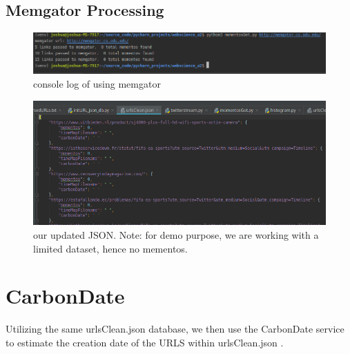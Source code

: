 \documentclass[11pt]{article}
\begin{document}
	\subsection{Memgator Processing}
	\begin{figure}[h!]
		\includegraphics[scale=0.5]{resources/memgator_console.png}
		\caption{console log of using memgator}
	\end{figure}
	\begin{figure}[h!]
		\includegraphics[scale=0.5]{resources/memgator_out.png}
		\caption{our updated JSON. Note: for demo purpose, we are working with a limited dataset, hence no mementos.}
	\end{figure}
	\section{CarbonDate }
	\hspace{10mm} Utilizing the same urlsClean.json database, we then use the CarbonDate service to estimate the creation date of the URLS within urlsClean.json .
\end{document}
